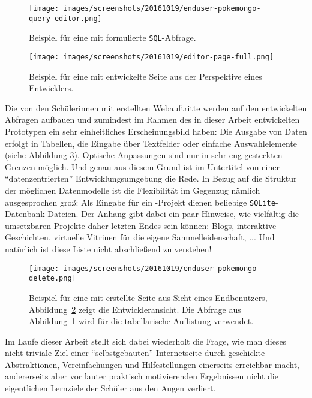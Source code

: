 \begin{figure}[h]
  \texttt{[image: images/screenshots/20161019/enduser-pokemongo-query-editor.png]}
  \caption{Beispiel für eine mit \idename{} formulierte \texttt{SQL}-Abfrage.}
  \label{fig:introduction-example-pokemon-go-query-editor}
\end{figure}

\begin{figure}[p]
  \texttt{[image: images/screenshots/20161019/editor-page-full.png]}
  \caption{Beispiel für eine mit \idename{} entwickelte Seite aus der Perspektive eines Entwicklers.}
  \label{fig:introduction-example-pokemon-go-page-editor}
\end{figure}

Die von den Schülerinnen mit \idename{} erstellten Webauftritte werden auf den entwickelten Abfragen aufbauen und zumindest im Rahmen des in dieser Arbeit entwickelten Prototypen ein sehr einheitliches Erscheinungsbild haben: Die Ausgabe von Daten erfolgt in Tabellen, die Eingabe über Textfelder oder einfache Auswahlelemente (siehe Abbildung \ref{fig:introduction-example-pokemon-go-catch}). Optische Anpassungen sind nur in sehr eng gesteckten Grenzen möglich. Und genau aus diesem Grund ist im Untertitel von einer "`datenzentrierten"' Entwicklungsumgebung die Rede. In Bezug auf die Struktur der möglichen Datenmodelle ist die Flexibilität im Gegenzug nämlich ausgesprochen groß: Als Eingabe für ein \idename{}-Projekt dienen beliebige \texttt{SQLite}-Datenbank-Dateien. Der Anhang gibt dabei ein paar Hinweise, wie vielfältig die umsetzbaren Projekte daher letzten Endes sein können: Blogs, interaktive Geschichten, virtuelle Vitrinen für die eigene Sammelleidenschaft, ... Und natürlich ist diese Liste nicht abschließend zu verstehen!

\begin{figure}[p]
  \texttt{[image: images/screenshots/20161019/enduser-pokemongo-delete.png]}
  \caption{Beispiel für eine mit \idename{} erstellte Seite aus Sicht eines Endbenutzers,  Abbildung~\ref{fig:introduction-example-pokemon-go-page-editor} zeigt die Entwickleransicht. Die Abfrage aus Abbildung~\ref{fig:introduction-example-pokemon-go-query-editor} wird für die tabellarische Auflistung verwendet.}
  \label{fig:introduction-example-pokemon-go-catch}
\end{figure}

Im Laufe dieser Arbeit stellt sich dabei wiederholt die Frage, wie man dieses nicht triviale Ziel einer "`selbstgebauten"' Internetseite durch geschickte Abstraktionen, Vereinfachungen und Hilfestellungen einerseits erreichbar macht, andererseits aber vor lauter praktisch motivierenden Ergebnissen nicht die eigentlichen Lernziele der Schüler aus den Augen verliert.

